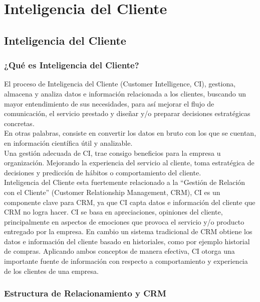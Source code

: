 \chapter[Inteligencia del Cliente]{Inteligencia del Cliente}
\label{ch:ic}

\section{Inteligencia del Cliente}
\subsection{¿Qué es Inteligencia del Cliente?}

El proceso de Inteligencia del Cliente (Customer Intelligence, CI), gestiona, almacena y analiza datos e información relacionada a los clientes, buscando un mayor entendimiento de sus necesidades, para así mejorar el flujo de comunicación, el servicio prestado y diseñar y/o preparar decisiones estratégicas concretas.\cite{ic}\\

En otras palabras, consiste en convertir los datos en bruto con los que se cuentan, en información científica útil y analizable. \cite{ic}\\

Una gestión adecuada de CI, trae consigo beneficios para la empresa u organización. Mejorando la experiencia del servicio al cliente, toma estratégica de decisiones y predicción de hábitos o comportamiento del cliente.\cite{ic}\\

Inteligencia del Cliente esta fuertemente relacionado a la ``Gestión de Relación con el Cliente'' (Customer Relationship Management, CRM), CI es un componente clave para CRM, ya que CI capta datos e información del cliente que CRM no logra hacer. CI se basa en apreciaciones, opiniones del cliente, principalmente en aspectos de emociones que provoca el servicio y/o producto entregado por la empresa. En cambio un sistema tradicional de CRM obtiene los datos e información del cliente basado en historiales, como por ejemplo historial de compras. Aplicando ambos conceptos de manera efectiva, CI otorga una importante fuente de información con respecto a comportamiento y experiencia de los clientes de una empresa.\cite{wikiic}\\


\subsection{Estructura de Relacionamiento y CRM}

